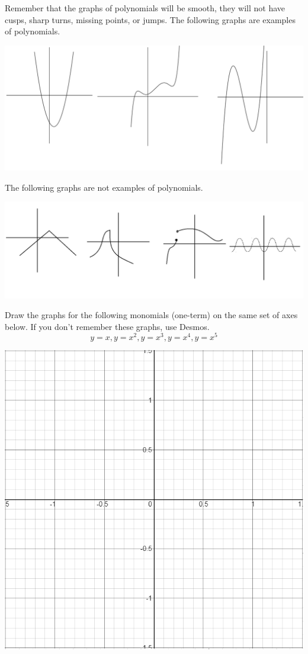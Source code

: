 Remember that the graphs of polynomials will be smooth, they will not have cusps, sharp turns, missing points, or jumps. The following graphs are examples of polynomials.

\begin{center} \includegraphics[scale=.45]{polyexamp.png} \end{center}

The following graphs are not examples of polynomials.

\begin{center} \includegraphics[scale=.35]{nonpolyexamp.png} \end{center}


\bq Draw the graphs for the following monomials (one-term) on the same set of axes below. If you don't remember these graphs, use Desmos.
$$ y=x, y=x^2, y=x^3, y=x^4, y=x^5$$

\begin{center} \includegraphics[scale=.65]{unitaxes.png} \end{center}

